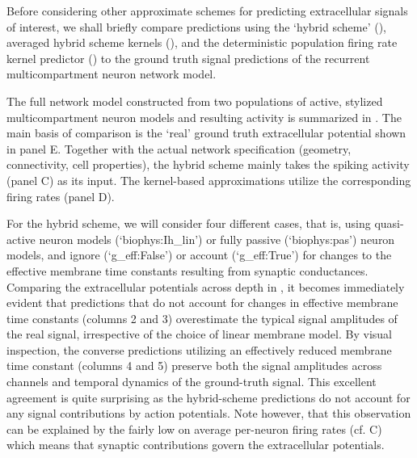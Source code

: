 Before considering other approximate schemes for predicting extracellular signals of interest, 
we shall briefly compare predictions using the `hybrid scheme' (),
averaged hybrid scheme kernels (),
and the deterministic population firing rate kernel predictor () to the ground truth signal predictions of the recurrent multicompartment neuron network model. 

The full network model constructed from two populations of active, stylized multicompartment neuron models and resulting activity is summarized in . 
The main basis of comparison is the `real' ground truth extracellular potential shown in panel E. 
Together with the actual network specification (geometry, connectivity, cell properties), 
the hybrid scheme mainly takes the spiking activity (panel C) as its input. 
The kernel-based approximations utilize the corresponding firing rates (panel D). 

For the hybrid scheme, 
we will consider four different cases, that is, using quasi-active neuron models (`biophys:Ih\_lin') or fully passive (`biophys:pas') neuron models, 
and ignore (`g\_eff:False') or account (`g\_eff:True') for changes to the effective membrane time constants resulting from synaptic conductances.  
Comparing the extracellular potentials across depth in ,
it becomes immediately evident that predictions that do not account for changes in effective membrane time constants (columns 2 and 3) overestimate the typical signal amplitudes of the real signal, 
irrespective of the choice of linear membrane model. 
By visual inspection, the converse predictions utilizing an effectively reduced membrane time constant (columns 4 and 5) preserve both the signal amplitudes across channels and temporal dynamics of the ground-truth signal. 
This excellent agreement is quite surprising as the hybrid-scheme predictions do not account for any signal contributions by action potentials. 
Note however, that this observation can be explained by the fairly low on average per-neuron firing rates (cf. C) which means that synaptic contributions govern the extracellular potentials.

